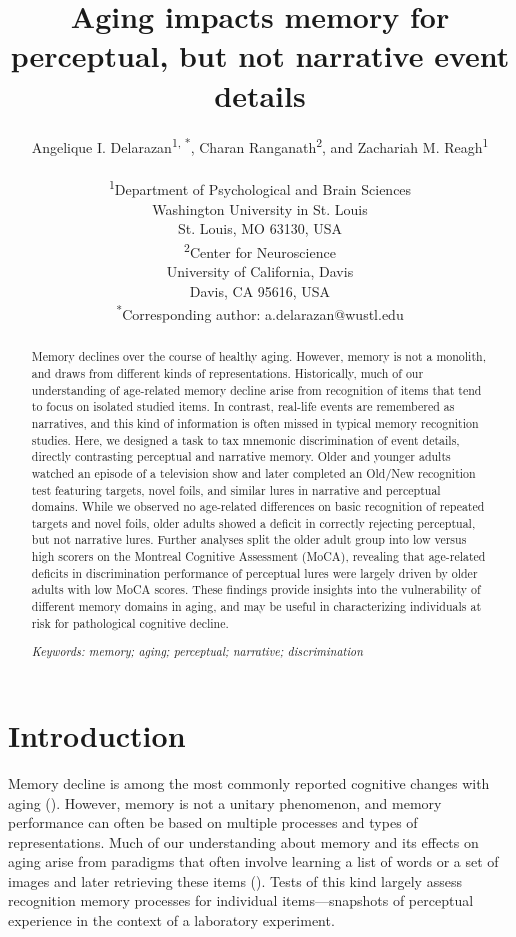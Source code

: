\documentclass[11pt]{article}
\title{Aging impacts memory for perceptual, but not narrative event details}
\author{Angelique I. Delarazan\textsuperscript{1, *}, Charan Ranganath\textsuperscript{2}, and Zachariah M. Reagh\textsuperscript{1}\\\\ \textsuperscript{1}Department of Psychological and Brain Sciences\\
Washington University in St. Louis \\
St. Louis, MO 63130, USA\\
\textsuperscript{2}Center for Neuroscience\\
University of California, Davis \\
Davis, CA 95616, USA\\
\textsuperscript{*}Corresponding author: a.delarazan@wustl.edu}
\date{}
\begin{document}
\begin{titlepage}
  \maketitle
  \thispagestyle{empty}
  \end{titlepage}

\begin{abstract}
Memory declines over the course of healthy aging. However, memory is not a monolith, and draws from different kinds of representations. Historically, much of our understanding of age-related memory decline arise from recognition of items that tend to focus on isolated studied items. In contrast, real-life events are remembered as narratives, and this kind of information is often missed in typical memory recognition studies.  Here, we designed a task to tax mnemonic discrimination of event details, directly contrasting perceptual and narrative memory. Older and younger adults watched an episode of a television show and later completed an Old/New recognition test featuring targets, novel foils, and similar lures in narrative and perceptual domains. While we observed no age-related differences on basic recognition of repeated targets and novel foils, older adults showed a deficit in correctly rejecting perceptual, but not narrative lures. Further analyses split the older adult group into low versus high scorers on the Montreal Cognitive Assessment (MoCA), revealing that age-related deficits in discrimination performance of perceptual lures were largely driven by older adults with low MoCA scores. These findings provide insights into the vulnerability of different memory domains in aging, and may be useful in characterizing individuals at risk for pathological cognitive decline.

\textit{Keywords: memory; aging; perceptual; narrative; discrimination} 
\end{abstract}

\section*{Introduction}
Memory decline is among the most commonly reported cognitive changes with aging (\cite{craik_memory_1994}). However, memory is not a unitary phenomenon, and memory performance can often be based on multiple processes and types of representations. Much of our understanding about memory and its effects on aging arise from paradigms that often involve learning a list of words or a set of images and later retrieving these items (\cite{fraundorf_aging_2019}). Tests of this kind largely assess recognition memory processes for individual items—snapshots of perceptual experience in the context of a laboratory experiment.
\end{document}
